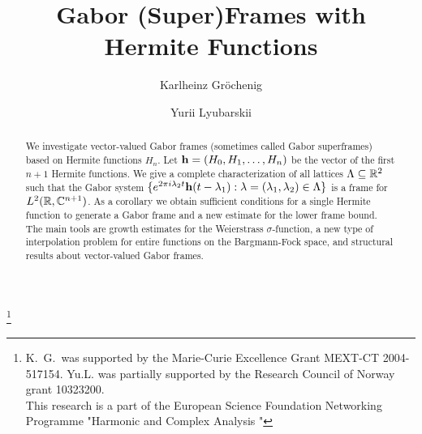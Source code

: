 \documentclass[12pt]{amsart}
\begin{document}
\newcommand{\vvlrd}{L^2(\bR , \bC ^n)}
\newcommand{\rd}{\bR ^d}
\newcommand{\rdd}{\bR ^{2d}}
\newcommand{\inv}{^{-1}}
\newcommand{\lrd}{L^2(\rd )}
\def\lr{L^2(\bR)}
\newcommand{\tfs}{time-frequency shift}
 \def\cS{\mathcal{S}}
\def\cK{\mathcal{K}}
\newcommand{\fif}{if and only if}

\newtheorem{thm}{Theorem}[section]
\newtheorem{lemma}[thm]{Lemma}
\newtheorem{defin}{Definition}[section]
\newtheorem{prop}[thm]{Proposition}
\newtheorem{cor}[thm]{Corollary}







\begin{abstract}
We investigate vector-valued  Gabor frames (sometimes called Gabor
superframes) based  on   Hermite 
functions $H_n$. Let $\mathbf {h} = (H_0, H_1, \dots ,  H_n)$ be the vector of the
first $n+1$ Hermite functions.  We  give a complete characterization
of all lattices  $\Lambda \subseteq \mathbb{R} ^2$  such that the Gabor system
 $\{ e^{2\pi i \lambda
_2 t} \mathbf {h} (t-\lambda _1): \lambda = (\lambda _1, \lambda _2) \in
\Lambda \}$ is a frame for $L^2 (\mathbb{R} , \mathbb{C} ^{n+1} )$. As a corollary
we obtain sufficient conditions for a single Hermite function to
generate a Gabor frame and a new estimate for the lower frame
bound. 
The  main tools are  growth estimates for the Weierstrass
$\sigma $-function, a new type of interpolation problem  for entire
functions on the Bargmann-Fock space, and structural results about
vector-valued Gabor frames. 
\end{abstract}


\title{Gabor (Super)Frames with Hermite Functions}
\author{Karlheinz Gr\"ochenig}
\address{Faculty of Mathematics \\
University of Vienna \\
Nordbergstrasse 15 \\
A-1090 Vienna, Austria}
\author{Yurii Lyubarskii}
\address{Department of Mathematics,
Norwegian University of Science and Technology,
7491, Trondheim, Norway}
\thanks{K.~G.~was supported by the Marie-Curie Excellence Grant
  MEXT-CT 2004-517154. Yu.L. was partially supported by the
Research Council of Norway grant 10323200.\\
This research is a part of the European Science  Foundation Networking Programme
"Harmonic   and Complex Analysis "}
\end{document}
